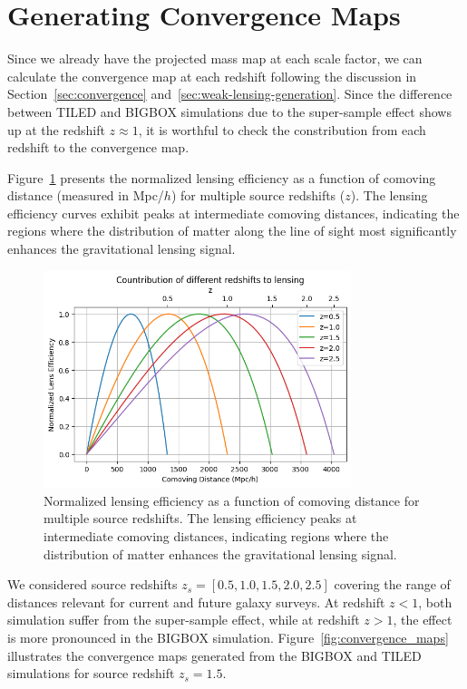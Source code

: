 \section{Generating Convergence Maps}
Since we already have the projected mass map at each scale factor, we can calculate the convergence map at each redshift following the discussion in Section~\ref{sec:convergence} and~\ref{sec:weak-lensing-generation}. Since the difference between TILED and BIGBOX simulations due to the super-sample effect shows up at the redshift $z \approx 1$, it is worthful to check the constribution from each redshift to the convergence map.

Figure~\ref{fig:lensing_efficiency} presents the normalized lensing efficiency as a function of comoving distance (measured in Mpc/$h$) for multiple source redshifts ($z$). The lensing efficiency curves exhibit peaks at intermediate comoving distances, indicating the regions where the distribution of matter along the line of sight most significantly enhances the gravitational lensing signal. 

\begin{figure}
    \centering
    \includegraphics[width=0.8\textwidth]{figures/lensefficiency.png}
    \caption{Normalized lensing efficiency as a function of comoving distance for multiple source redshifts. The lensing efficiency peaks at intermediate comoving distances, indicating regions where the distribution of matter enhances the gravitational lensing signal.} \label{fig:lensing_efficiency}
\end{figure}

We considered source redshifts $z_s = [0.5, 1.0, 1.5, 2.0, 2.5]$ covering the range of distances relevant for current and future galaxy surveys. At redshift $z < 1$, both simulation suffer from the super-sample effect, while at redshift $z > 1$, the effect is more pronounced in the BIGBOX simulation. Figure~\ref{fig:convergence_maps} illustrates the convergence maps generated from the BIGBOX and TILED simulations for source redshift $z_s = 1.5$. 

